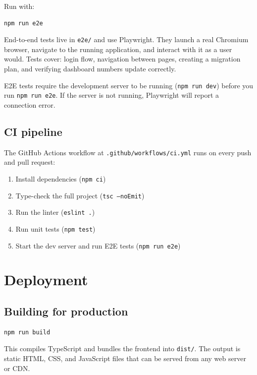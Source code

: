 \documentclass[12pt,a4paper]{article}
\begin{document}
Run with:
\begin{lstlisting}
npm run e2e
\end{lstlisting}

End-to-end tests live in \texttt{e2e/} and use Playwright. They launch a real Chromium browser, navigate to the running application, and interact with it as a user would. Tests cover: login flow, navigation between pages, creating a migration plan, and verifying dashboard numbers update correctly.

\begin{warnbox}
E2E tests require the development server to be running (\texttt{npm run dev}) before you run \texttt{npm run e2e}. If the server is not running, Playwright will report a connection error.
\end{warnbox}

\subsection{CI pipeline}

The GitHub Actions workflow at \texttt{.github/workflows/ci.yml} runs on every push and pull request:

\begin{enumerate}
  \item Install dependencies (\texttt{npm ci})
  \item Type-check the full project (\texttt{tsc --noEmit})
  \item Run the linter (\texttt{eslint .})
  \item Run unit tests (\texttt{npm test})
  \item Start the dev server and run E2E tests (\texttt{npm run e2e})
\end{enumerate}

\section{Deployment}
\label{sec:deploy}

\subsection{Building for production}

\begin{lstlisting}
npm run build
\end{lstlisting}

This compiles TypeScript and bundles the frontend into \texttt{dist/}. The output is static HTML, CSS, and JavaScript files that can be served from any web server or CDN.
\end{document}
